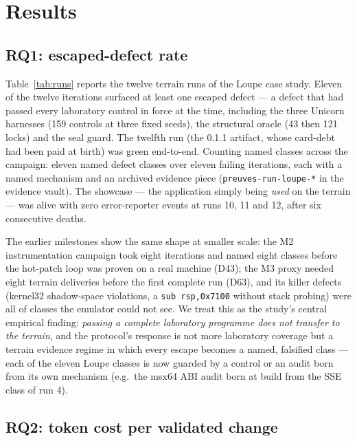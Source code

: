 \documentclass[11pt,a4paper]{article}
\newcommand{\code}[1]{\texttt{\small #1}}
\begin{document}


\section{Results}\label{sec:results}

\subsection{RQ1: escaped-defect rate}\label{sec:rq1}

Table~\ref{tab:runs} reports the twelve terrain runs of the Loupe case
study. Eleven of the twelve iterations surfaced at least one escaped
defect --- a defect that had passed every laboratory control in force at
the time, including the three Unicorn harnesses (159 controls at three
fixed seeds), the structural oracle (43 then 121 locks) and the seal
guard. The twelfth run (the 0.1.1 artifact, whose card-debt had been paid
at birth) was green end-to-end. Counting named classes across the
campaign: eleven named defect classes over eleven failing iterations,
each with a named mechanism and an archived evidence piece
(\code{preuves-run-loupe-*} in the evidence vault). The showcase ---
the application simply being \emph{used} on the terrain --- was alive with
zero error-reporter events at runs 10, 11 and 12, after six consecutive
deaths.

The earlier milestones show the same shape at smaller scale: the M2
instrumentation campaign took eight iterations and named eight classes
before the hot-patch loop was proven on a real machine (D43); the M3
proxy needed eight terrain deliveries before the first complete run
(D63), and its killer defects (kernel32 shadow-space violations, a
\code{sub rsp,0x7100} without stack probing) were all of classes the
emulator could not see. We treat this as the study's central empirical
finding: \emph{passing a complete laboratory programme does not transfer
to the terrain}, and the protocol's response is not more laboratory
coverage but a terrain evidence regime in which every escape becomes a
named, falsified class --- each of the eleven Loupe classes is now
guarded by a control or an audit born from its own mechanism (e.g.\ the
msx64 ABI audit born at build from the SSE class of run 4).

\subsection{RQ2: token cost per validated change}\label{sec:rq2}
\end{document}
